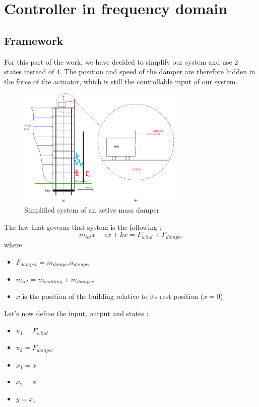 \section{Controller in frequency domain}

\subsection{Framework}
For this part of the work, we have decided to simplify our system and use 2 states instead of 4. The position and speed of the damper are therefore hidden in the force of the actuator, which is still the controllable input of our system.
\begin{figure}[H]
    \centering
    \includegraphics[width=0.7\textwidth]{resources/png/simplified-system.png}
    \caption{Simplified system of an active mass damper}
    \label{fig:simplified-system}
\end{figure}
The law that governs that system is the following : 
$$
m_{tot}\ddot{x} + c\dot{x} + kx = F_{wind} + F_{damper}
$$
where
\begin{itemize}
    \item $F_{damper} = m_{damper}a_{damper}$
    \item $m_{tot} = m_{building} + m_{damper}$
    \item $x$ is the position of the building relative to its rest position ($x = 0$)
\end{itemize}
Let's now define the input, output and states : 
\begin{itemize}
    \item $u_1 = F_{wind}$
    \item $u_2 = F_{damper}$
    \item $x_1 = x$
    \item $x_2 = \dot{x}$
    \item $y = x_1$ 
\end{itemize}
